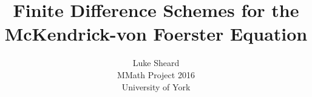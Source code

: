 \documentclass[11pt, a4paper]{report}
\title{Finite Difference Schemes for the McKendrick-von Foerster Equation}
\author{
  Luke Sheard \\
  MMath Project 2016 \\
  University of York
}
\theoremstyle{definition}
\theoremstyle{plain}
\begin{document}
  \def\biblio{}
  \raggedright
  \allowdisplaybreaks

  {
    
  }

  

  

  

  

  \begin{appendix}
  \end{appendix}

  \newpage
  
  
\end{document}
